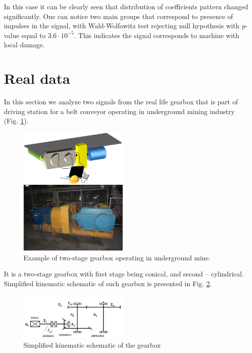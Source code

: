 \documentclass[preprint]{elsarticle}
\begin{document}
In this case it can be clearly seen that distribution of coefficients pattern changed significantly. One can notice two main groups that correspond to presence of impulses in the signal, with Wald-Wolfowitz test rejecting null hypothesis with \emph{p}-value equal to $3.6 \cdot 10^{-5}$. This indicates the signal corresponds to machine with local damage.

\section{Real data}

In this section we analyze two signals from the real life gearbox that is part of driving station for a belt conveyor operating in underground mining industry (Fig. \ref{fig:real_machine}). 

\begin{figure}[ht!]
\centering
\includegraphics[width=0.48\textwidth]{wykresy/real_machine}
\caption{Example of two-stage gearbox operating in underground mine.}
\label{fig:real_machine}
\end{figure}

It is a two-stage gearbox with first stage being conical, and second – cylindrical. Simplified kinematic schematic of such gearbox is presented in Fig. 
\ref{fig:real_kinematic_scheme}.

\begin{figure}[ht!]
\centering
\includegraphics[width=0.48\textwidth]{wykresy/real_kinematic_scheme.png}
\caption{Simplified kinematic schematic of the gearbox}
\label{fig:real_kinematic_scheme}
\end{figure}
\end{document}
